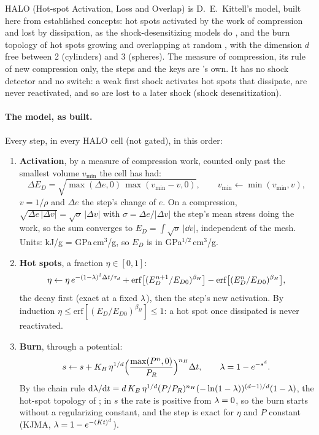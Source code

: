 HALO (Hot-spot Activation, Loss and Overlap) is D.~E.~Kittell's model, built
here from established concepts: hot spots activated by the work of
compression and lost by dissipation, as the shock-desensitizing models do
\cite{menikoff2010}, and the burn topology of hot spots growing and
overlapping at random \cite{hill2009}, with the dimension $d$ free between 2
(cylinders) and 3 (spheres). The measure of compression, its rule of new
compression only, the steps and the keys are \bw's own. It has no shock
detector and no switch: a weak first shock activates hot spots that
dissipate, are never reactivated, and so are lost to a later shock (shock
desensitization).

\paragraph{The model, as built.} Every step, in every HALO cell (not
gated), in this order:
\begin{enumerate}
\item \textbf{Activation}, by a measure of compression work, counted only
  past the smallest volume $v_{\min}$ the cell has had:
  \begin{equation}
    \Delta E_D = \sqrt{\max(\Delta e, 0)\,\max(v_{\min} - v, 0)},
    \qquad v_{\min} \leftarrow \min(v_{\min}, v),
    \label{eq:halo-ed}
  \end{equation}
  $v = 1/\rho$ and $\Delta e$ the step's change of $e$. On a compression,
  $\sqrt{\Delta e\,|\Delta v|} = \sqrt{\sigma}\,|\Delta v|$ with $\sigma =
  \Delta e/|\Delta v|$ the step's mean stress doing the work, so the sum
  converges to $E_D = \int\sqrt{\sigma}\,|\dd v|$, independent of the mesh.
  Units: kJ/g = GPa\,cm$^3$/g, so $E_D$ is in GPa$^{1/2}$\,cm$^3$/g.
\item \textbf{Hot spots}, a fraction $\eta \in [0, 1]$:
  \begin{equation}
    \eta \leftarrow \eta\,e^{-(1 - \lambda)^{\delta}\Delta t/\tau_d}
    + \mathrm{erf}\bigl[(E_D^{n+1}/E_{D0})^{\beta_H}\bigr]
    - \mathrm{erf}\bigl[(E_D^{n}/E_{D0})^{\beta_H}\bigr],
    \label{eq:halo-eta}
  \end{equation}
  the decay first (exact at a fixed $\lambda$), then the step's new
  activation. By induction $\eta \le \mathrm{erf}[(E_D/E_{D0})^{\beta_H}]
  \le 1$: a hot spot once dissipated is never reactivated.
\item \textbf{Burn}, through a potential:
  \begin{equation}
    s \leftarrow s + K_B\,\eta^{1/d}
      \Bigl(\frac{\max(P^n, 0)}{P_R}\Bigr)^{n_H}\Delta t,
    \qquad \lambda = 1 - e^{-s^{d}}.
    \label{eq:halo-burn}
  \end{equation}
  By the chain rule $\mathrm{d}\lambda/\mathrm{d} t = d\,K_B\,\eta^{1/d}(P/P_R)^{n_H}
  (-\ln(1 - \lambda))^{(d-1)/d}(1 - \lambda)$, the hot-spot topology of
  \cite{hill2009}; in $s$ the rate is positive from $\lambda = 0$, so the burn
  starts without a regularizing constant, and the step is exact for $\eta$
  and $P$ constant (KJMA, $\lambda = 1 - e^{-(Kt)^d}$).
\end{enumerate}
